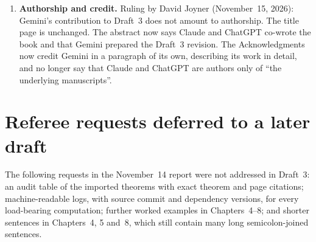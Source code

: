 \documentclass[12pt,letterpaper]{amsart}
\begin{document}
\begin{enumerate}[leftmargin=*,label=\textbf{C\arabic*.}]
\item \textbf{Authorship and credit.} Ruling by David Joyner (November~15, 2026): Gemini's contribution to Draft~3 does not amount to authorship. The title page is unchanged. The abstract now says Claude and ChatGPT co-wrote the book and that Gemini prepared the Draft~3 revision. The Acknowledgments now credit Gemini in a paragraph of its own, describing its work in detail, and no longer say that Claude and ChatGPT are authors only of ``the underlying manuscripts''.
\end{enumerate}

\section{Referee requests deferred to a later draft}
The following requests in the November~14 report were not addressed in Draft~3: an audit table of the imported theorems with exact theorem and page citations; machine-readable logs, with source commit and dependency versions, for every load-bearing computation; further worked examples in Chapters~4--8; and shorter sentences in Chapters~4, 5 and~8, which still contain many long semicolon-joined sentences.
\end{document}
